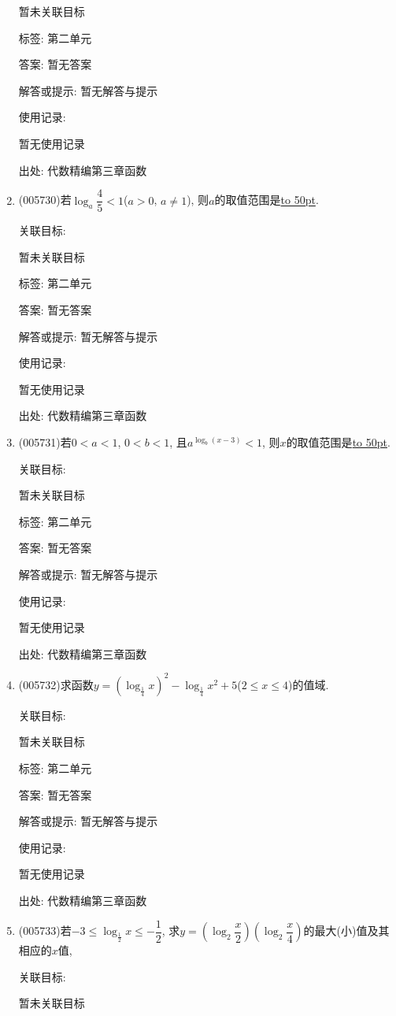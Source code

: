 \documentclass[10pt,a4paper]{article}
\newcommand{\blank}[1]{\underline{\hbox to #1pt{}}}
\begin{document}
\begin{enumerate}[1.]
暂未关联目标



标签: 第二单元

答案: 暂无答案

解答或提示: 暂无解答与提示

使用记录:

暂无使用记录


出处: 代数精编第三章函数
\item { (005730)}若$\log_a\dfrac 45<1$($a>0$, $a\ne 1$), 则$a$的取值范围是\blank{50}.


关联目标:

暂未关联目标



标签: 第二单元

答案: 暂无答案

解答或提示: 暂无解答与提示

使用记录:

暂无使用记录


出处: 代数精编第三章函数
\item { (005731)}若$0<a<1$, $0<b<1$, 且$a^{\log_b(x-3)}<1$, 则$x$的取值范围是\blank{50}.


关联目标:

暂未关联目标



标签: 第二单元

答案: 暂无答案

解答或提示: 暂无解答与提示

使用记录:

暂无使用记录


出处: 代数精编第三章函数
\item { (005732)}求函数$y=(\log_{\frac 14}x)^2-\log_{\frac 14}x^2+5$($2\le x\le 4$)的值域.


关联目标:

暂未关联目标



标签: 第二单元

答案: 暂无答案

解答或提示: 暂无解答与提示

使用记录:

暂无使用记录


出处: 代数精编第三章函数
\item { (005733)}若$-3\le \log_{\frac 12}x\le -\dfrac 12$, 求$y=(\log_2\dfrac x2)(\log_2\dfrac x4)$的最大(小)值及其相应的$x$值,


关联目标:

暂未关联目标




\end{enumerate}
\end{document}
